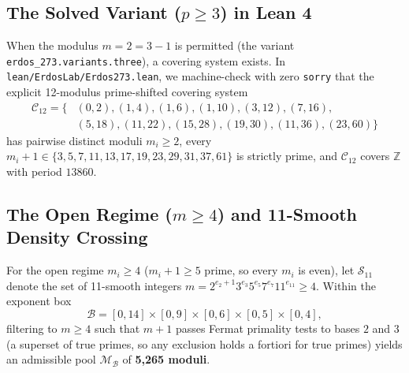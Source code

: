 \documentclass[10pt,twocolumn]{article}
\theoremstyle{definition}
\begin{document}
\subsection{The Solved Variant ($p \ge 3$) in Lean 4}
When the modulus $m = 2 = 3 - 1$ is permitted (the variant \texttt{erdos\_273.variants.three}), a covering system exists. In \texttt{lean/ErdosLab/Erdos273.lean}, we machine-check with zero \texttt{sorry} that the explicit 12-modulus prime-shifted covering system
\begin{equation}
\begin{aligned}
  \mathcal{C}_{12} = \{&(0,2),(1,4),(1,6),(1,10),(3,12),(7,16),\\
  &(5,18),(11,22),(15,28),(19,30),(11,36),(23,60)\}
\end{aligned}
\end{equation}
has pairwise distinct moduli $m_i \ge 2$, every $m_i + 1 \in \{3, 5, 7, 11, 13, 17, 19, 23, 29, 31, 37, 61\}$ is strictly prime, and $\mathcal{C}_{12}$ covers $\mathbb{Z}$ with period $13860$.

\subsection{The Open Regime ($m \ge 4$) and 11-Smooth Density Crossing}
For the open regime $m_i \ge 4$ ($m_i + 1 \ge 5$ prime, so every $m_i$ is even), let $\mathcal{S}_{11}$ denote the set of 11-smooth integers $m = 2^{e_2+1} 3^{e_3} 5^{e_5} 7^{e_7} 11^{e_{11}} \ge 4$. Within the exponent box
\begin{equation}
  \mathcal{B} = [0, 14] \times [0, 9] \times [0, 6] \times [0, 5] \times [0, 4],
\end{equation}
filtering to $m \ge 4$ such that $m+1$ passes Fermat primality tests to bases $2$ and $3$ (a superset of true primes, so any exclusion holds a fortiori for true primes) yields an admissible pool $\mathcal{M}_{\mathcal{B}}$ of \textbf{5,265 moduli}.
\end{document}
